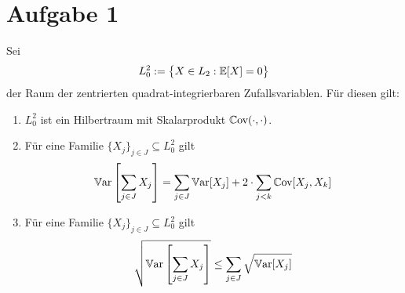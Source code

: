 \documentclass[12pt,a4paper]{article}
\author{Willi Sontopski}
\begin{document}

\section*{Aufgabe 1}
Sei
\begin{align*}
L_0^2:=\big\lbrace X\in L_2:\mathbb{E}[X]=0\big\rbrace
\end{align*}
der Raum der zentrierten quadrat-integrierbaren Zufallsvariablen. Für diesen gilt:
\begin{enumerate}[label=\alph*)]
\item $L_0^2$ ist ein Hilbertraum mit Skalarprodukt $\mathbb{C}\text{ov}(\cdot,\cdot)$.
\item Für eine Familie $\lbrace X_j\rbrace_{j\in J}\subseteq L_0^2$ gilt
\begin{align*}
\mathbb{V}\text{ar}\left[\sum\limits_{j\in J}X_j\right]=\sum\limits_{j\in J}\mathbb{V}\text{ar}[X_j]+2\cdot\sum\limits_{j<k}\mathbb{C}\text{ov}[X_j,X_k]
\end{align*}
\item Für eine Familie $\lbrace X_j\rbrace_{j\in J}\subseteq L_0^2$ gilt
\begin{align*}
\sqrt{\mathbb{V}\text{ar}\left[\sum\limits_{j\in J}X_j\right]}\leq\sum\limits_{j\in J}\sqrt{\mathbb{V}\text{ar}[X_j]}
\end{align*}
\end{enumerate}
\end{document}
